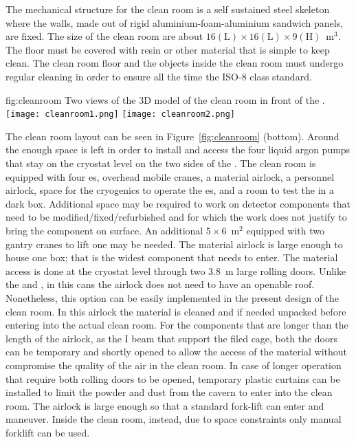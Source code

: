 The mechanical structure for the clean room is a self sustained steel skeleton where the walls, made out of rigid aluminium-foam-aluminium sandwich panels, are fixed.
The size of the clean room are about $16 \mathrm{(L)} \times 16 \mathrm{(L)} \times 9 \mathrm{(H)}$~m$^3$.
The floor must be covered with resin or other material that is simple to keep clean.
The clean room floor and the objects inside the clean room must undergo regular cleaning in order to ensure all the time the ISO-8 class standard.

\begin{dunefigure}{fig:cleanroom}
{Two views of the 3D model of the clean room in front of the .}
\texttt{[image: cleanroom1.png]}
\texttt{[image: cleanroom2.png]}
\end{dunefigure}

The clean room layout can be seen in Figure~\ref{fig:cleanroom} (bottom).
Around the  enough space is left in order to install and access the four liquid argon pumps that stay on the cryostat level on the two sides of the .
The clean room is equipped with four  \coldbox{}es, overhead mobile cranes, a material airlock, a personnel airlock, space for the cryogenics to operate the  \coldbox{}es, and a room to test the  in a dark box.
Additional space may be required to work on detector components that need to be modified/fixed/refurbished and for which the work does not justify to bring the component on surface.
An additional $5\times6$~m$^2$ equipped with two gantry cranes to lift one  may be needed.
The material airlock is large enough to house one  box; that is the widest component that needs to enter.
The material access is done at the cryostat level through two 3.8~m large rolling doors.
Unlike the  and , in this cans the airlock does not need to have an openable roof.
Nonetheless, this option can be easily implemented in the present design of the clean room.
In this airlock the material is cleaned and if needed unpacked before entering into the actual clean room.
For the components that are longer than the length of the airlock, as the I beam that support the filed cage, both the doors can be temporary and shortly opened to allow the access of the material without compromise the quality of the air in the clean room.
In case of longer operation that require both rolling doors to be opened, temporary plastic curtains can be installed to limit the powder and dust from the cavern to enter into the clean room.
The airlock is large enough so that a standard fork-lift can enter and maneuver.
Inside the clean room, instead, due to space constraints only manual forklift can be used.

